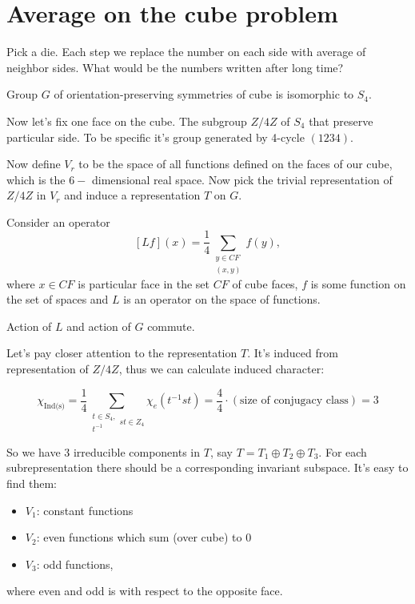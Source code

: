\documentclass{amsart}
\begin{document}
\section{Average on the cube problem}

\begin{example}
    Pick a die. Each step we replace the number on each side with average of neighbor sides.
What would be the numbers written after long time?
\end{example}

\begin{lemma}
    Group $G$ of orientation-preserving symmetries of cube is isomorphic to $S_4$.
\end{lemma}
Now let's fix one face on the cube. The subgroup $Z/4Z$ of $S_4$ that preserve particular side. To be specific it's group generated by 4-cycle $(1234)$.

Now define $V_r$ to be the space of all functions defined on the faces of our cube, which is the $6-$ dimensional real space. Now pick the trivial representation of $Z/4Z$ in $V_r$ and induce a representation $T$ on $G$.

Consider an operator $$[Lf] (x) = \frac{1}{4}\sum_{\substack{y\in CF \\ (x, y)}} f(y),$$
where $x \in CF$ is particular face in the set $CF$ of cube faces, $f$ is some function on the set of spaces and $L$ is an operator on the space of functions.

\begin{lemma}
    Action of $L$ and action of $G$ commute.
\end{lemma}

Let's pay closer attention to the representation $T$. It's induced from representation of $Z/4Z$, thus we can calculate induced character:

$$\chi_{\text{Ind(s)}} = \frac{1}{4} \sum_{\substack{t \in S_4,\\ t^{-1}} s t \in Z_4 } \chi_e (t^{-1} s t) = \frac{4}{4} \cdot (\text{size of conjugacy class}) = 3$$

So we have 3 irreducible components in $T$, say  $T = T_1 \oplus T_2 \oplus T_3$.
For each subrepresentation there should be a corresponding invariant subspace. It's easy to find them:
\begin{itemize}
    \item $V_1$: constant functions
    \item $V_2$: even functions which sum (over cube) to 0
    \item $V_3$: odd functions,
\end{itemize} 
where even and odd is with respect to the opposite face.
\end{document}
